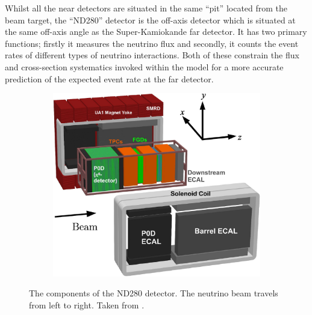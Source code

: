 Whilst all the near detectors are situated in the same ``pit'' located  from the beam target, the ``ND280'' detector is the off-axis detector which is situated at the same off-axis angle as the Super-Kamiokande far detector. It has two primary functions; firstly it measures the neutrino flux and secondly, it counts the event rates of different types of neutrino interactions. Both of these constrain the flux and cross-section systematics invoked within the model for a more accurate prediction of the expected event rate at the far detector.

\begin{figure}[h]
  \begin{subfigure}[t]{0.7\textwidth}
    \includegraphics[width=\textwidth, trim={0mm 0mm 0mm 0mm}, clip,page=1]{Figures/Detectors/T2KND280.pdf}
  \end{subfigure}
  \caption{The components of the ND280 detector. The neutrino beam travels from left to right. Taken from \cite{t2k_det}.}
  \label{fig:T2KSKExp_T2K_ND280}
\end{figure}

